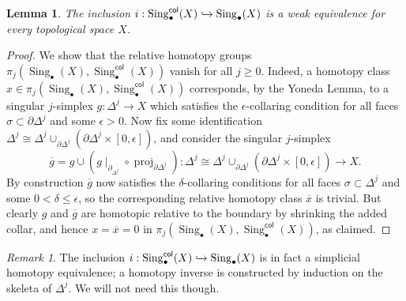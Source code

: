 \documentclass[a4paper, oneside]{amsart}
\newtheorem{lemma}[theorem]{Lemma}
\newcommand{\1}{\mathds{1}}
\newcommand{\Sing}{\operatorname{Sing}}
\theoremstyle{remark}
\newtheorem{remark}[theorem]{Remark}
\theoremstyle{definition}
\numberwithin{equation}{section}
\begin{document}
\begin{lemma}
    The inclusion $i:\Sing^{\mathsf{col}}_\bullet(X)\xhookrightarrow{}\Sing_\bullet(X)$ is a weak equivalence for every topological space $X$.
\end{lemma}
\begin{proof}
We show that the relative homotopy groups $\pi_j(\Sing_\bullet(X),\Sing^{\mathsf{col}}_\bullet(X))$ vanish for all $j\geq 0$. Indeed, a homotopy class $x\in \pi_j(\Sing_\bullet(X),\Sing^{\mathsf{col}}_\bullet(X))$ corresponds, by the Yoneda Lemma, to a singular $j$-simplex $g: \Delta^j\to X$ which satisfies the $\epsilon$-collaring condition for all faces $\sigma\subset \partial\Delta^j$ and some $\epsilon>0$. Now fix some identification $\Delta^j\cong\Delta^j\cup_{\partial\Delta^j}(\partial\Delta^j\times[0,\epsilon])$, and consider the singular $j$-simplex
$$
\overline g=g\cup(g\mid_{\partial_{\Delta^j}}\circ\operatorname{proj}_{\partial\Delta^j}):\Delta^j\cong\Delta^j\cup_{\partial\Delta^j}(\partial\Delta^j\times[0,\epsilon])\longrightarrow X.
$$
By construction $\overline g$ now satisfies the $\delta$-collaring conditions for all faces $\sigma\subset\Delta^j$ and some $0<\delta\leq\epsilon$, so the corresponding relative homotopy class $\overline{x}$ is trivial. But clearly $g$ and $\overline{g}$ are homotopic relative to the boundary by shrinking the added collar, and hence $x=\overline{x}=0$ in $\pi_j(\Sing_\bullet(X),\Sing^{\mathsf{col}}_\bullet(X))$, as claimed.
\end{proof}
\begin{remark}
    The inclusion $i: \Sing_\bullet^{\mathsf{col}}(X)\xhookrightarrow{}\Sing_\bullet(X)$ is in fact a simplicial homotopy equivalence; a homotopy inverse is constructed by induction on the skeleta of $\Delta^j$. We will not need this though.
\end{remark}
\end{document}
